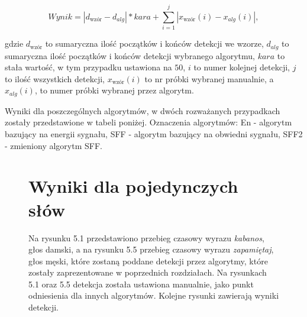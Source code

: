 \documentclass[eng,printmode]{mgr}
\begin{document}
 \begin{equation}
 	Wynik = |d_{\textrm{wzór}} - d_{alg}|*kara + \sum_{i=1}^{j}| x_{\textrm{wzór}}(i)-x_{alg}(i) |,
 \end{equation}
 
 gdzie $d_{\textrm{wzór}}$ to sumaryczna ilość początków i końców detekcji we wzorze, $d_{alg}$ to sumaryczna ilość początków i końców detekcji wybranego algorytmu, $kara$ to stała wartość, w tym przypadku ustawiona na $50$, $i$ to numer kolejnej detekcji, $j$ to ilość wszystkich detekcji, $x_{\textrm{wzór}}(i)$ to nr próbki wybranej manualnie, a $x_{alg}(i)$, to numer próbki wybranej przez algorytm.
 
  Wyniki dla poszczególnych algorytmów, w dwóch rozważanych przypadkach zostały przedstawione w tabeli poniżej. Oznaczenia algorytmów: En - algorytm bazujący na energii sygnału, SFF - algorytm bazujący na obwiedni sygnału, SFF2 - zmieniony algorytm SFF.

\begin{figure}
\section{Wyniki dla pojedynczych słów}
	Na rysunku 5.1 przedstawiono przebieg czasowy wyrazu \emph{kabanos}, głos damski, a na rysunku 5.5 przebieg czasowy wyrazu \emph{zapamiętaj}, głos męski, które zostaną poddane detekcji przez algorytmy, które zostały zaprezentowane w poprzednich rozdziałach. Na rysunkach 5.1 oraz 5.5 detekcja została ustawiona manualnie, jako punkt odniesienia dla innych algorytmów.
	Kolejne rysunki zawierają wyniki detekcji.
\end{figure}
\end{document}

